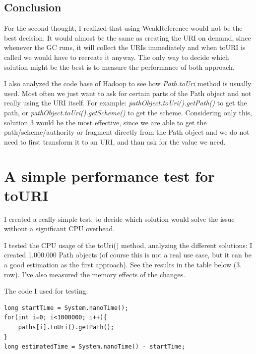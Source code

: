 \subsection{Conclusion}
For the second thought, I realized that using WeakReference would not be the best decision. It would almost be the same as creating the URI on demand, since whenever the GC runs, it will collect the URIs immediately and when toURI is called we would have to recreate it anyway. The only way to decide which solution might be the best is to measure the performance of both approach. 

I also analyzed the code base of Hadoop to see how \textit{Path.toUri} method is usually used. Most often we just want to ask for certain parts of the Path object and not really using the URI itself. For example: \textit{pathObject.toUri().getPath()} to get the path, or \textit{pathObject.toUri().getScheme()} to get the scheme. Considering only this, solution 3 would be the most effective, since we are able to get the path/scheme/authority or fragment directly from the Path object and we do not need to first transform it to an URI, and than ask for the value we need. 

\section{A simple performance test for toURI}
I created a really simple test, to decide which solution would solve the issue without a significant CPU overhead. 

I tested the CPU usage of the toUri() method, analyzing the different solutions: I created 1.000.000 Path objects (of course this is not a real use case, but it can be a good estimation as the first approach). See the results in the table below (3. row). I’ve also measured the memory effects of the changes. 

\noindent The code I used for testing:
\begin{lstlisting}
long startTime = System.nanoTime();
for(int i=0; i<1000000; i++){
	paths[i].toUri().getPath();
}
long estimatedTime = System.nanoTime() - startTime;
\end{lstlisting}

